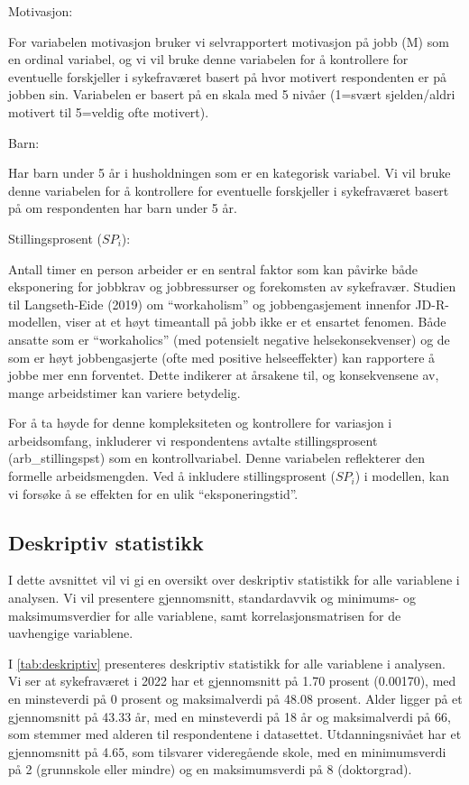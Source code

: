\documentclass[
  12pt,
  a4paper,
  DIV=11,
  numbers=noendperiod]{scrartcl}
\begin{document}
Motivasjon:

For variabelen motivasjon bruker vi selvrapportert motivasjon på jobb
(M) som en ordinal variabel, og vi vil bruke denne variabelen for å
kontrollere for eventuelle forskjeller i sykefraværet basert på hvor
motivert respondenten er på jobben sin. Variabelen er basert på en skala
med 5 nivåer (1=svært sjelden/aldri motivert til 5=veldig ofte
motivert).

Barn:

Har barn under 5 år i husholdningen som er en kategorisk variabel. Vi
vil bruke denne variabelen for å kontrollere for eventuelle forskjeller
i sykefraværet basert på om respondenten har barn under 5 år.

Stillingsprosent (\(SP_i\)):

Antall timer en person arbeider er en sentral faktor som kan påvirke
både eksponering for jobbkrav og jobbressurser og forekomsten av
sykefravær. Studien til Langseth-Eide (2019) om ``workaholism'' og
jobbengasjement innenfor JD-R-modellen, viser at et høyt timeantall på
jobb ikke er et ensartet fenomen. Både ansatte som er ``workaholics''
(med potensielt negative helsekonsekvenser) og de som er høyt
jobbengasjerte (ofte med positive helseeffekter) kan rapportere å jobbe
mer enn forventet. Dette indikerer at årsakene til, og konsekvensene av,
mange arbeidstimer kan variere betydelig.

For å ta høyde for denne kompleksiteten og kontrollere for variasjon i
arbeidsomfang, inkluderer vi respondentens avtalte stillingsprosent
(arb\_stillingspst) som en kontrollvariabel. Denne variabelen
reflekterer den formelle arbeidsmengden. Ved å inkludere
stillingsprosent (\(SP_i\)) i modellen, kan vi forsøke å se effekten for
en ulik ``eksponeringstid''.

\subsection{Deskriptiv statistikk}\label{deskriptiv-statistikk}

I dette avsnittet vil vi gi en oversikt over deskriptiv statistikk for
alle variablene i analysen. Vi vil presentere gjennomsnitt,
standardavvik og minimums- og maksimumsverdier for alle variablene, samt
korrelasjonsmatrisen for de uavhengige variablene.

I \autoref{tab:deskriptiv} presenteres deskriptiv statistikk for alle
variablene i analysen. Vi ser at sykefraværet i 2022 har et gjennomsnitt
på 1.70 prosent (0.00170), med en minsteverdi på 0 prosent og
maksimalverdi på 48.08 prosent. Alder ligger på et gjennomsnitt på 43.33
år, med en minsteverdi på 18 år og maksimalverdi på 66, som stemmer med
alderen til respondentene i datasettet. Utdanningsnivået har et
gjennomsnitt på 4.65, som tilsvarer videregående skole, med en
minimumsverdi på 2 (grunnskole eller mindre) og en maksimumsverdi på 8
(doktorgrad).
\end{document}
